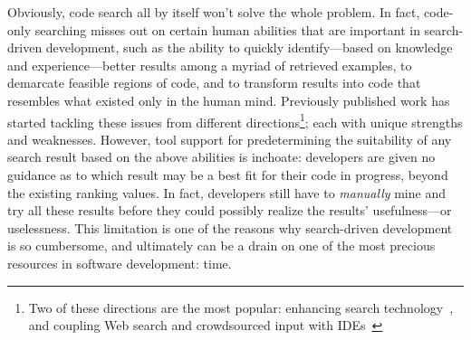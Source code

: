 Obviously, code search all by itself won't solve the whole problem. In fact, code-only searching misses out on certain human abilities that are important in search-driven development, such as the ability to quickly identify---based on knowledge and experience---better results among a myriad of retrieved examples, to demarcate feasible regions of code, and to transform results into code that resembles what existed only in the human mind. Previously published work has started tackling these issues from different directions\footnote{Two of these directions are the most popular: enhancing search technology~\cite{Bajracharya:2010um, Gysin:2010kt, McMillan:2011cm, McMillan:2012dj, Ying:2012tr}, and coupling Web search and crowdsourced input with IDEs~\cite{Bacchelli:2012dl, Brandt:2010tp, Hartmann:2010hx, Hoffmann:2007wo, Oney:2012ge, Wightman:2012gc}}; each with unique strengths and weaknesses. However, tool support for predetermining the suitability of any search result based on the above abilities is inchoate: developers are given no guidance as to which result may be a best fit for their code in progress, beyond the existing ranking values. In fact, developers still have to \emph{manually} mine and try all these results before they could possibly realize the results' usefulness---or uselessness. This limitation is one of the reasons why search-driven development is so cumbersome, and ultimately can be a drain on one of the most precious resources in software development: time.




